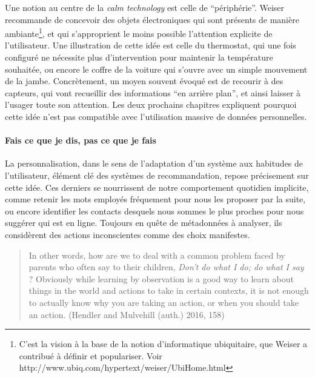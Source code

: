 \documentclass[]{article}
\let\oldparagraph\paragraph
\renewcommand{\paragraph}[1]{\oldparagraph{#1}\mbox{}}
\begin{document}
Une notion au centre de la \emph{calm technology} est celle de
``périphérie''. Weiser recommande de concevoir des objets électroniques
qui sont présents de manière ambiante\footnote{C'est la vision à la base
  de la notion d'informatique ubiquitaire, que Weiser a contribué à
  définir et populariser. Voir
  http://www.ubiq.com/hypertext/weiser/UbiHome.html}, et qui
s'approprient le moins possible l'attention explicite de l'utilisateur.
Une illustration de cette idée est celle du thermostat, qui une fois
configuré ne nécessite plus d'intervention pour maintenir la température
souhaitée, ou encore le coffre de la voiture qui s'ouvre avec un simple
mouvement de la jambe. Concrètement, un moyen souvent évoqué est de
recourir à des capteurs, qui vont recueillir des informations ``en
arrière plan'', et ainsi laisser à l'usager toute son attention. Les
deux prochains chapitres expliquent pourquoi cette idée n'est pas
compatible avec l'utilisation massive de données personnelles.

\hypertarget{fais-ce-que-je-dis-pas-ce-que-je-fais}{%
\paragraph{Fais ce que je dis, pas ce que je
fais}\label{fais-ce-que-je-dis-pas-ce-que-je-fais}}

La personnalisation, dans le sens de l'adaptation d'un système aux
habitudes de l'utilisateur, élément clé des systèmes de recommandation,
repose précisement sur cette idée. Ces derniers se nourrissent de notre
comportement quotidien implicite, comme retenir les mots employés
fréquement pour nous les proposer par la suite, ou encore identifier les
contacts desquels nous sommes le plus proches pour nous suggérer qui est
en ligne. Toujours en quête de métadonnées à analyser, ils considèrent
des actions inconscientes comme des choix manifestes.

\begin{quote}
In other words, how are we to deal with a common problem faced by
parents who often say to their children, \emph{Don't do what I do; do
what I say} ? Obviously while learning by observation is a good way to
learn about things in the world and actions to take in certain contexts,
it is not enough to actually know why you are taking an action, or when
you should take an action. (Hendler and Mulvehill (auth.) 2016, 158)
\end{quote}
\end{document}

